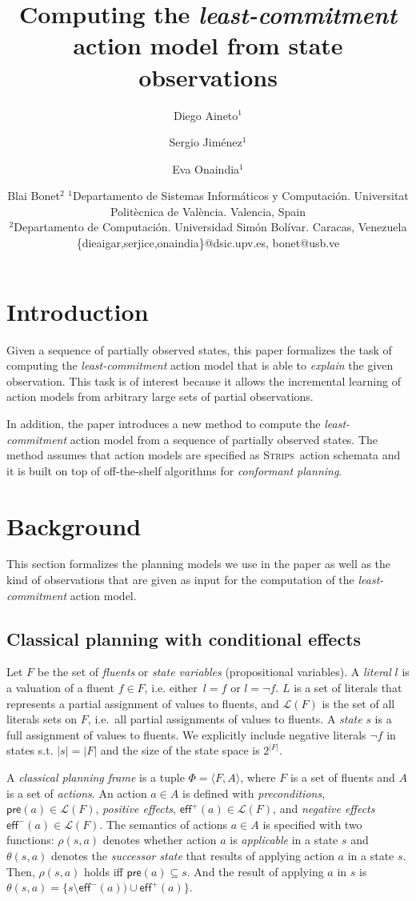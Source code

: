 \documentclass{article}
\title{Computing the {\em least-commitment} action model from state observations}
\author{
Diego Aineto$^1$\and
Sergio Jim\'enez$^1$\and
Eva Onaindia$^1$\And
\and
Blai Bonet$^2$
\affiliations
$^1${\small Departamento de Sistemas Inform\'aticos y Computaci\'on. Universitat Polit\`ecnica de Val\`encia. Valencia, Spain}\\
$^2${\small Departamento de Computaci\'on. Universidad Sim\'on Bolívar. Caracas, Venezuela}
\emails
{\scriptsize \{dieaigar,serjice,onaindia\}@dsic.upv.es, bonet@usb.ve}}
\newcommand{\tup}[1]{{\langle #1 \rangle}}
\newcommand{\pre}{\mathsf{pre}}     %
\newcommand{\eff}{\mathsf{eff}}     %
\newcommand{\strips}{\textsc{Strips}}
\begin{document}
\maketitle

\begin{abstract}
  
\end{abstract}

\section{Introduction}
Given a sequence of partially observed states, this paper formalizes the task of computing the {\em least-commitment} action model that is able to {\em explain} the given observation. This task is of interest because it allows the incremental learning of action models from arbitrary large sets of partial observations.

In addition, the paper introduces a new method to compute the {\em least-commitment} action model from a sequence of partially observed states. The method assumes that action models are specified as \strips\ action schemata and it is built on top of off-the-shelf algorithms for {\em conformant planning}.



\section{Background}
This section formalizes the planning models we use in the paper as well as the kind of observations that are given as input for the computation of the {\em least-commitment} action model.  

\subsection{Classical planning with conditional effects}
Let $F$ be the set of {\em fluents} or {\em state variables} (propositional variables). A {\em literal} $l$ is a valuation of a fluent $f\in F$, i.e. either~$l=f$ or $l=\neg f$. $L$ is a set of literals that represents a partial assignment of values to fluents, and $\mathcal{L}(F)$ is the set of all literals sets on $F$, i.e.~all partial assignments of values to fluents. A {\em state} $s$ is a full assignment of values to fluents. We explicitly include negative literals $\neg f$ in states s.t. $|s|=|F|$ and the size of the state space is $2^{|F|}$.

A {\em classical planning frame} is a tuple $\Phi=\tup{F,A}$, where $F$ is a set of fluents and $A$ is a set of \emph{actions}. An action $a\in A$ is defined with {\em preconditions}, $\pre(a)\in\mathcal{L}(F)$, {\em positive effects}, $\eff^+(a)\in\mathcal{L}(F)$, and {\em negative effects} $\eff^-(a)\in\mathcal{L}(F)$. The semantics of actions $a\in A$ is specified with two functions: $\rho(s,a)$ denotes whether action $a$ is {\em applicable} in a state $s$ and $\theta(s,a)$ denotes the {\em successor state} that results of applying action $a$ in a state $s$. Then, $\rho(s,a)$ holds iff $\pre(a)\subseteq s$. And the result of applying $a$ in $s$ is $\theta(s,a)=\{s\setminus\eff^-(a))\cup\eff^+(a)\}$.
\end{document}
